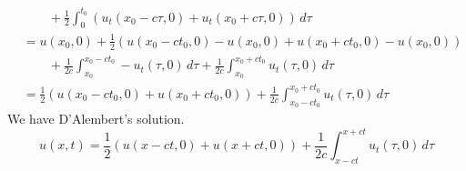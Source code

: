 {\begin{Solution}
\begin{enumerate}
\begin{align*}
      &\qquad + \frac{1}{2} \int_0^{t_0}
      \left( u_t(x_0-c \tau,0) + u_t(x_0+c \tau,0) \right)\,d\tau \\
      &= u(x_0,0) + \frac{1}{2} \left( u(x_0-c t_0,0) - u(x_0,0) 
        + u(x_0+c t_0,0) - u(x_0,0) \right) \\
      &\qquad + \frac{1}{2c} \int_{x_0}^{x_0-c t_0} - u_t(\tau,0) \,d \tau 
      + \frac{1}{2c} \int_{x_0}^{x_0+c t_0} u_t(\tau,0) \,d\tau \\
      &= \frac{1}{2} \left( u(x_0-c t_0,0) + u(x_0+c t_0,0) \right)
      + \frac{1}{2c} \int_{x_0-c t_0}^{x_0+c t_0} 
      u_t(\tau,0) \,d\tau
    \end{align*}
    We have D'Alembert's solution.
    \[
    \boxed{
      u(x,t) = \frac{1}{2} \left( u(x-c t,0) + u(x+c t,0) \right)
      + \frac{1}{2c} \int_{x-c t}^{x+c t} u_t(\tau,0) \,d\tau
      }
    \]
  \end{enumerate}
\end{Solution}






}

